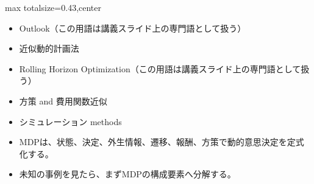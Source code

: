 \clearpage
{}
\begin{minipage}[t]{0.405\textwidth}
\begin{adjustbox}{max totalsize={\textwidth}{0.43\textheight},center}
\begin{minipage}{\textwidth}\scriptsize
{}\begin{itemize}
\item Outlook（この用語は講義スライド上の専門語として扱う）
\item 近似動的計画法
\item Rolling Horizon Optimization（この用語は講義スライド上の専門語として扱う）
\item 方策 and 費用関数近似
\item シミュレーション methods
\end{itemize}\begin{itemize}
\item MDPは、状態、決定、外生情報、遷移、報酬、方策で動的意思決定を定式化する。
\item 未知の事例を見たら、まずMDPの構成要素へ分解する。
\end{itemize}
\end{minipage}
\end{adjustbox}
\end{minipage}\hfill
